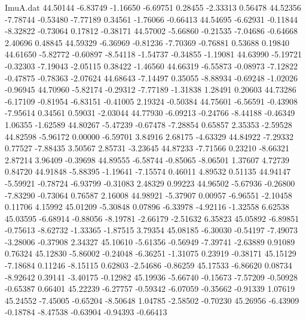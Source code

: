 \begin{filecontents}{ImuA.dat}
  44.50144   -6.83749   -1.16650   -6.69751    0.28455   -2.33313    0.56478
  44.52356   -7.78744   -0.53480   -7.77189    0.34561   -1.76066   -0.66413
  44.54695   -6.62931   -0.11844   -8.32822   -0.73064    0.17812   -0.38171
  44.57002   -5.66860   -0.21535   -7.04686   -0.64668    2.40696    0.48845
  44.59329   -6.36969   -0.81236   -7.70369   -0.76881    0.53688    0.19840
  44.61650   -5.82772   -0.60897   -8.54118   -1.54737   -0.34855   -1.19081
  44.63990   -5.19721   -0.32303   -7.19043   -2.05115    0.38422   -1.46560
  44.66319   -6.55873   -0.08973   -7.12822   -0.47875   -0.78363   -2.07624
  44.68643   -7.14497    0.35055   -8.88934   -0.69248   -1.02026   -0.96945
  44.70960   -5.82174   -0.29312   -7.77189   -1.31838    1.28491    0.20603
  44.73286   -6.17109   -0.81954   -6.83151   -0.41005    2.19324   -0.50384
  44.75601   -6.56591   -0.43908   -7.95614    0.34561    0.59031   -2.03044
  44.77930   -6.09213   -0.24766   -8.44188   -0.46349    1.06355   -1.62589
  44.80267   -5.47239   -0.67478   -7.28854    0.65857    2.35353   -2.59528
  44.82598   -5.96172    0.00000   -6.59701    3.84916    2.68175   -4.63329
  44.84922   -7.29332    0.77527   -7.88435    3.50567    2.85731   -3.23645
  44.87233   -7.71566    0.23210   -8.66321    2.87214    3.96409   -0.39698
  44.89555   -6.58744   -0.85065   -8.06501    1.37607    4.72739    0.84720
  44.91848   -5.88395   -1.19641   -7.15574    0.46011    4.89532    0.51135
  44.94147   -5.59921   -0.78724   -6.93799   -0.31083    2.48329    0.99223
  44.96502   -5.67936   -0.26800   -7.83290   -0.73064    0.76587    2.16008
  44.98921   -5.37907    0.00957   -6.96551   -2.10458    0.11706    4.15992
  45.01209   -5.30848    0.07896   -6.33978   -4.92116   -1.32558    6.62538
  45.03595   -6.68914   -0.88056   -8.19781   -2.66179   -2.51632    6.35823
  45.05892   -6.89851   -0.75613   -8.62732   -1.33365   -1.87515    3.79354
  45.08185   -6.30030   -0.54197   -7.49073   -3.28006   -0.37908    2.34327
  45.10610   -5.61356   -0.56949   -7.39741   -2.63889    0.91089    0.76324
  45.12830   -5.86002   -0.24048   -6.36251   -1.31075    0.23919   -0.38171
  45.15129   -7.18684    0.11246   -8.15115    0.62803   -2.54686   -0.86259
  45.17533   -6.86620    0.08734   -8.92642    0.39141   -3.40175   -0.12982
  45.19936   -5.66740   -0.15673   -7.57209   -0.50928   -0.65387    0.66401
  45.22239   -6.27757   -0.59342   -6.07059   -0.35662   -0.91339    1.07619
  45.24552   -7.45005   -0.65204   -8.50648    1.04785   -2.58502   -0.70230
  45.26956   -6.43909   -0.18784   -8.47538   -0.63904   -0.94393   -0.66413

\end{filecontents}
